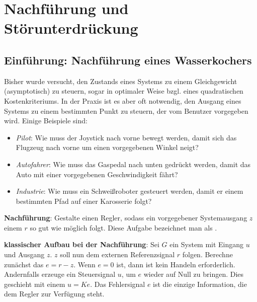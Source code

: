 \section{%
    Nachführung und Störunterdrückung%
}

\subsection{%
    Einführung: Nachführung eines Wasserkochers%
}

Bisher wurde versucht, den Zustands eines Systems zu einem Gleichgewicht (asymptotisch) zu steuern,
sogar in optimaler Weise bzgl. eines quadratischen Kostenkriteriums.
In der Praxis ist es aber oft notwendig, den Ausgang eines Systems zu einem bestimmten Punkt zu
steuern, der vom Benutzer vorgegeben wird.
Einige Beispiele sind:
\begin{itemize}
    \item
    \emph{Pilot}:
    Wie muss der Joystick nach vorne bewegt werden, damit sich das Flugzeug nach vorne um
    einen vorgegebenen Winkel neigt?

    \item
    \emph{Autofahrer}:
    Wie muss das Gaspedal nach unten gedrückt werden, damit das Auto mit einer vorgegebenen
    Geschwindigkeit fährt?

    \item
    \emph{Industrie}:
    Wie muss ein Schweißroboter gesteuert werden, damit er einem bestimmten Pfad auf einer
    Karosserie folgt?
\end{itemize}

\textbf{Nachführung}:
Gestalte einen Regler,
sodass ein vorgegebener Systemausgang $z$ einem  $r$
so gut wie möglich folgt.
Diese Aufgabe bezeichnet man als .

\linie

\textbf{klassischer Aufbau bei der Nachführung}:
Sei $G$ ein System mit Eingang $u$ und Ausgang $z$.
$z$ soll nun dem externen Referenzsignal $r$ folgen.
Berechne zunächst das  $e = r - z$.
Wenn $e = 0$ ist, dann ist kein Handeln erforderlich.
Andernfalls erzeuge ein Steuersignal $u$, um $e$ wieder auf Null zu bringen.
Dies geschieht mit einem  $u = Ke$.
Das Fehlersignal $e$ ist die einzige Information, die dem Regler zur Verfügung steht.

\linie

